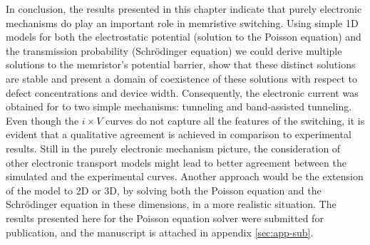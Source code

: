 In conclusion, the results presented in this chapter indicate that purely electronic mechanisms do play an important role in memristive switching. Using simple 1D models for both the electrostatic potential (solution to the Poisson equation) and the transmission probability (Schr\"odinger equation) we could derive multiple solutions to the memristor's potential barrier, show that these distinct solutions are stable and present a domain of coexistence of these solutions with respect to defect concentrations and device width. Consequently, the electronic current was obtained for to two simple mechanisms: tunneling and band-assisted tunneling. Even though the $i \times V$ curves do not capture all the features of the switching, it is evident that a qualitative agreement is achieved in comparison to experimental results. Still in the purely electronic mechanism picture, the consideration of other electronic transport models might lead to better agreement between the simulated and the experimental curves. Another approach would be the extension of the model to 2D or 3D, by solving both the Poisson equation and the Schr\"odinger equation in these dimensions, in a more realistic situation. The results presented here for the Poisson equation solver were submitted for publication, and the manuscript is attached in appendix \ref{sec:app-sub}.